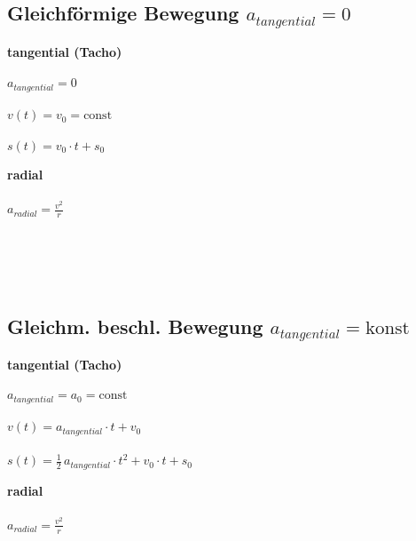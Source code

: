 	
	
	
	\subsection{Gleichförmige Bewegung $a_{tangential} = 0$}
	
	\begin{minipage}{0.6\linewidth}
	\textbf{tangential (Tacho)} \\
	\\
	$a_{tangential} = 0$ \\
	\\
	$v(t) = v_0 = \text{const}$ \\
	\\
	$s(t) = v_0 \cdot t + s_0$ \\
	\end{minipage}
	\hfill
	\begin{minipage}{0.35\linewidth}
	\textbf{radial} \\
	\\
	$a_{radial} = \frac{v^2}{r}$ \\
	\\
	\\
	\\
	\\
	\end{minipage}
	
	
	
	\subsection{Gleichm. beschl. Bewegung $a_{tangential} = \text{konst}$}		
	\begin{minipage}{0.6\linewidth}
	\textbf{tangential (Tacho)} \\
	\\
	$a_{tangential} = a_0 = \text{const}$ \\
	\\
	$v(t) = a_{tangential} \cdot t + v_0 $ \\
	\\
	$s(t) = \frac{1}{2} \, a_{tangential} \cdot t^2 +  v_0 \cdot t + s_0$ \\
	\end{minipage}
	\hfill
	\begin{minipage}{0.35\linewidth}
	\textbf{radial} \\
	\\
	$a_{radial} = \frac{v^2}{r}$ \\
	\\
	\\
	\\
	\\
	\end{minipage}
	
